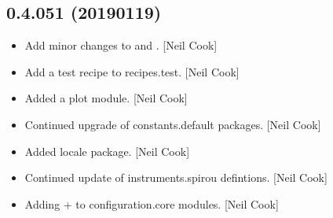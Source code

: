 \documentclass[a4paper,10pt,english]{report}
\begin{document}
\subsection{0.4.051 (2019\sphinxhyphen{}01\sphinxhyphen{}19)}
\label{\detokenize{misc/changelog:id232}}\begin{itemize}
\item {} 
Add minor changes to  and . {[}Neil Cook{]}

\item {} 
Add a test recipe to recipes.test. {[}Neil Cook{]}

\item {} 
Added a plot module. {[}Neil Cook{]}

\item {} 
Continued upgrade of constants.default packages. {[}Neil Cook{]}

\item {} 
Added locale package. {[}Neil Cook{]}

\item {} 
Continued update of instruments.spirou defintions. {[}Neil Cook{]}

\item {} 
Adding  +   to configuration.core modules. {[}Neil
Cook{]}

\end{itemize}
\end{document}

